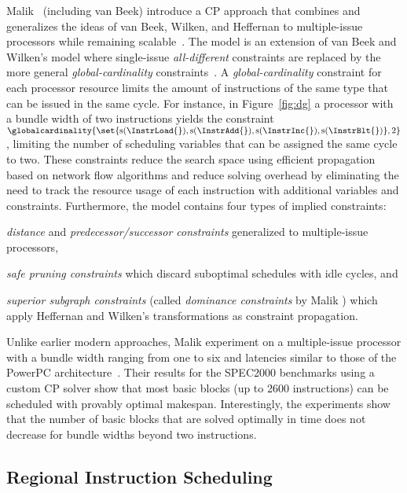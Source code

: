 \documentclass[acmsmall,authorversion,nonacm]{acmart}
\newcommand{\noMathVar}[2]{\operatorname{#1}(#2)}
\begin{document}
Malik~\etal{} (including van Beek) introduce a CP approach that
combines and generalizes the ideas of van Beek, Wilken, and Heffernan
to multiple-issue processors while remaining
scalable~\cite{Malik2008}.
The model is an extension of van Beek and Wilken's model where
single-issue \emph{all-different} constraints are replaced by the more
general \emph{global-cardinality} constraints~\cite{CPH:global}.
A \emph{global-cardinality} constraint for each processor resource
limits the amount of instructions of the same type that can be issued
in the same cycle.
For instance, in Figure~\ref{fig:dg} a processor with a bundle width
of two instructions yields the constraint
$\globalcardinality{\set{\noMathVar{s}{\InstrLoad{}},
    \noMathVar{s}{\InstrAdd{}}, \noMathVar{s}{\InstrInc{}},
    \noMathVar{s}{\InstrBlt{}}}, 2}$, limiting the number of
scheduling variables that can be assigned the same cycle to two.
These constraints reduce the search space using efficient propagation
based on network flow algorithms and reduce solving overhead by
eliminating the need to track the resource usage of each instruction
with additional variables and constraints.
Furthermore, the model contains four types of implied constraints:
\begin{inparaitem}[]
\item \emph{distance} and \emph{predecessor/successor constraints}
  generalized to multiple-issue processors,
\item \emph{safe pruning constraints} which discard suboptimal
  schedules with idle cycles, and
\item \emph{superior subgraph constraints} (called \emph{dominance
  constraints} by Malik \etal{}) which apply Heffernan and Wilken's
  transformations as constraint propagation.
\end{inparaitem}
Unlike earlier modern approaches, Malik \etal{} experiment on a
multiple-issue processor with a bundle width ranging from one to six
and latencies similar to those of the PowerPC
architecture~\cite{Diefendorff1994}.
Their results for the SPEC2000 benchmarks using a custom CP solver
show that most basic blocks (up to 2600 instructions) can be scheduled
with provably optimal makespan.
Interestingly, the experiments show that the number of basic blocks
that are solved optimally in time does not decrease for bundle widths
beyond two instructions.

\subsection{Regional Instruction Scheduling}
\label{sec:regional-instruction-scheduling}
\end{document}
